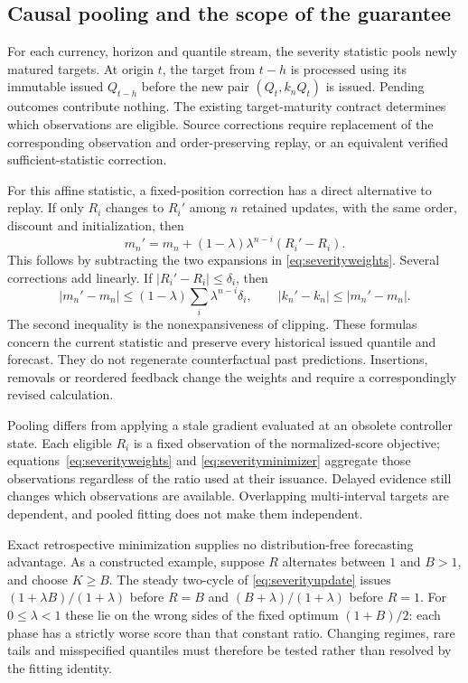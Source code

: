 \documentclass[11pt,a4paper]{article}
\theoremstyle{definition}\newtheorem{definition}[theorem]{Definition}
\begin{document}
\subsection{Causal pooling and the scope of the guarantee}
For each currency, horizon and quantile stream, the severity statistic pools newly matured targets. At origin $t$, the target from $t-h$ is processed using its immutable issued $Q_{t-h}$ before the new pair $(Q_t,k_nQ_t)$ is issued. Pending outcomes contribute nothing. The existing target-maturity contract determines which observations are eligible. Source corrections require replacement of the corresponding observation and order-preserving replay, or an equivalent verified sufficient-statistic correction.

For this affine statistic, a fixed-position correction has a direct alternative to replay. If only $R_i$ changes to $R_i'$ among $n$ retained updates, with the same order, discount and initialization, then
\begin{equation}
 m_n'=m_n+(1-\lambda)\lambda^{n-i}(R_i'-R_i).
 \label{eq:severitycorrection}
\end{equation}
This follows by subtracting the two expansions in \eqref{eq:severityweights}. Several corrections add linearly. If $|R_i'-R_i|\le\delta_i$, then
\begin{equation}
 |m_n'-m_n|\le(1-\lambda)\sum_i\lambda^{n-i}\delta_i,
 \qquad |k_n'-k_n|\le|m_n'-m_n|.
 \label{eq:severitycorrectionbound}
\end{equation}
The second inequality is the nonexpansiveness of clipping. These formulas concern the current statistic and preserve every historical issued quantile and forecast. They do not regenerate counterfactual past predictions. Insertions, removals or reordered feedback change the weights and require a correspondingly revised calculation.

Pooling differs from applying a stale gradient evaluated at an obsolete controller state. Each eligible $R_i$ is a fixed observation of the normalized-score objective; equations~\eqref{eq:severityweights} and \eqref{eq:severityminimizer} aggregate those observations regardless of the ratio used at their issuance. Delayed evidence still changes which observations are available. Overlapping multi-interval targets are dependent, and pooled fitting does not make them independent.

Exact retrospective minimization supplies no distribution-free forecasting advantage. As a constructed example, suppose $R$ alternates between $1$ and $B>1$, and choose $K\ge B$. The steady two-cycle of \eqref{eq:severityupdate} issues $(1+\lambda B)/(1+\lambda)$ before $R=B$ and $(B+\lambda)/(1+\lambda)$ before $R=1$. For $0\le\lambda<1$ these lie on the wrong sides of the fixed optimum $(1+B)/2$: each phase has a strictly worse score than that constant ratio. Changing regimes, rare tails and misspecified quantiles must therefore be tested rather than resolved by the fitting identity.
\end{document}
